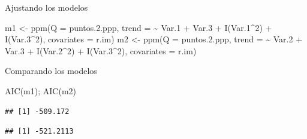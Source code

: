 \documentclass[
  11pt,
  ignorenonframetext,
]{beamer}
\newenvironment{Shaded}{}{}
\newcommand{\AttributeTok}[1]{\textcolor[rgb]{0.49,0.56,0.16}{#1}}
\newcommand{\DecValTok}[1]{\textcolor[rgb]{0.25,0.63,0.44}{#1}}
\newcommand{\FloatTok}[1]{\textcolor[rgb]{0.25,0.63,0.44}{#1}}
\newcommand{\FunctionTok}[1]{\textcolor[rgb]{0.02,0.16,0.49}{#1}}
\newcommand{\NormalTok}[1]{#1}
\newcommand{\OtherTok}[1]{\textcolor[rgb]{0.00,0.44,0.13}{#1}}
\newcommand{\SpecialCharTok}[1]{\textcolor[rgb]{0.25,0.44,0.63}{#1}}
\begin{document}
\begin{frame}[fragile]{Ajustando los modelos}
\protect\hypertarget{ajustando-los-modelos}{}
\begin{Shaded}
\begin{Highlighting}[]
\NormalTok{m1 }\OtherTok{\textless{}{-}} \FunctionTok{ppm}\NormalTok{(}\AttributeTok{Q =}\NormalTok{ puntos.}\FloatTok{2.}\NormalTok{ppp,}
          \AttributeTok{trend =} \SpecialCharTok{\textasciitilde{}}\NormalTok{ Var}\FloatTok{.1} \SpecialCharTok{+}\NormalTok{ Var}\FloatTok{.3} \SpecialCharTok{+} \FunctionTok{I}\NormalTok{(Var}\FloatTok{.1}\SpecialCharTok{\^{}}\DecValTok{2}\NormalTok{) }\SpecialCharTok{+} \FunctionTok{I}\NormalTok{(Var}\FloatTok{.3}\SpecialCharTok{\^{}}\DecValTok{2}\NormalTok{),}
          \AttributeTok{covariates =}\NormalTok{ r.im)}
\NormalTok{m2 }\OtherTok{\textless{}{-}} \FunctionTok{ppm}\NormalTok{(}\AttributeTok{Q =}\NormalTok{ puntos.}\FloatTok{2.}\NormalTok{ppp,}
          \AttributeTok{trend =} \SpecialCharTok{\textasciitilde{}}\NormalTok{ Var}\FloatTok{.2} \SpecialCharTok{+}\NormalTok{ Var}\FloatTok{.3} \SpecialCharTok{+} \FunctionTok{I}\NormalTok{(Var}\FloatTok{.2}\SpecialCharTok{\^{}}\DecValTok{2}\NormalTok{) }\SpecialCharTok{+} \FunctionTok{I}\NormalTok{(Var}\FloatTok{.3}\SpecialCharTok{\^{}}\DecValTok{2}\NormalTok{),}
          \AttributeTok{covariates =}\NormalTok{ r.im)}
\end{Highlighting}
\end{Shaded}
\end{frame}

\begin{frame}[fragile]{Comparando los modelos}
\protect\hypertarget{comparando-los-modelos}{}
\begin{Shaded}
\begin{Highlighting}[]
\FunctionTok{AIC}\NormalTok{(m1); }\FunctionTok{AIC}\NormalTok{(m2)}
\end{Highlighting}
\end{Shaded}

\begin{verbatim}
## [1] -509.172
\end{verbatim}

\begin{verbatim}
## [1] -521.2113
\end{verbatim}
\end{frame}
\end{document}
